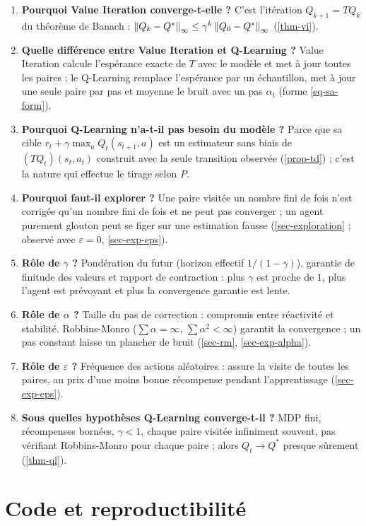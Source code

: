 \begin{enumerate}[leftmargin=*]
\item \textbf{Pourquoi Value Iteration converge-t-elle ?} C'est l'itération $Q_{k+1}=TQ_k$ du théorème de Banach : $\left\lVert Q_k-Q^* \right\rVert_\infty\le\gamma^k\left\lVert Q_0-Q^* \right\rVert_\infty$ (\cref{thm-vi}).
\item \textbf{Quelle différence entre Value Iteration et Q-Learning ?} Value Iteration calcule l'espérance exacte de $T$ avec le modèle et met à jour toutes les paires ; le Q-Learning remplace l'espérance par un échantillon, met à jour une seule paire par pas et moyenne le bruit avec un pas $\alpha_t$ (forme \eqref{eq-sa-form}).
\item \textbf{Pourquoi Q-Learning n'a-t-il pas besoin du modèle ?} Parce que sa cible $r_t+\gamma\max_aQ_t(s_{t+1},a)$ est un estimateur sans biais de $(TQ_t)(s_t,a_t)$ construit avec la seule transition observée (\cref{prop-td}) ; c'est la nature qui effectue le tirage selon $P$.
\item \textbf{Pourquoi faut-il explorer ?} Une paire visitée un nombre fini de fois n'est corrigée qu'un nombre fini de fois et ne peut pas converger ; un agent purement glouton peut se figer sur une estimation fausse (\cref{sec-exploration} ; observé avec $\varepsilon=0$, \cref{sec-exp-eps}).
\item \textbf{Rôle de $\gamma$ ?} Pondération du futur (horizon effectif $1/(1-\gamma)$), garantie de finitude des valeurs et rapport de contraction : plus $\gamma$ est proche de $1$, plus l'agent est prévoyant et plus la convergence garantie est lente.
\item \textbf{Rôle de $\alpha$ ?} Taille du pas de correction : compromis entre réactivité et stabilité. Robbins-Monro ($\sum\alpha=\infty$, $\sum\alpha^2<\infty$) garantit la convergence ; un pas constant laisse un plancher de bruit (\cref{sec-rm}, \cref{sec-exp-alpha}).
\item \textbf{Rôle de $\varepsilon$ ?} Fréquence des actions aléatoires : assure la visite de toutes les paires, au prix d'une moins bonne récompense pendant l'apprentissage (\cref{sec-exp-eps}).
\item \textbf{Sous quelles hypothèses Q-Learning converge-t-il ?} MDP fini, récompenses bornées, $\gamma<1$, chaque paire visitée infiniment souvent, pas vérifiant Robbins-Monro pour chaque paire ; alors $Q_t\to Q^*$ presque sûrement (\cref{thm-ql}).
\end{enumerate}

\section{Code et reproductibilité}\label{sec-code}

